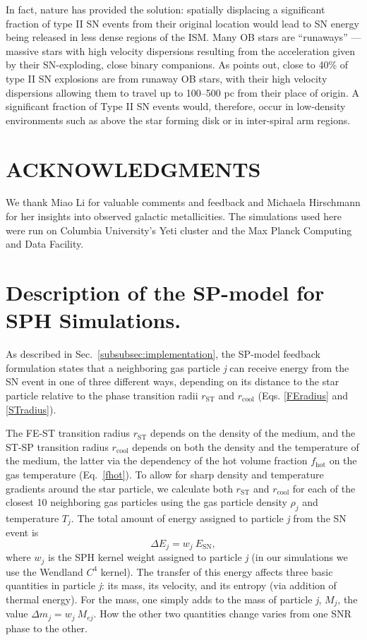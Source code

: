 \documentclass[iop]{emulateapj}
\begin{document}
In fact, nature has provided the solution: spatially displacing a significant fraction of type II SN events from their original location would lead to SN energy being released in less dense regions of the ISM. Many OB stars are ``runaways'' ---massive stars with high velocity dispersions resulting from the acceleration given by their SN-exploding, close binary companions. As \citet{Li15} points out, close to 40\% of type II SN explosions are from runaway OB stars, with their high velocity dispersions allowing them to travel up to 100--500 pc from their place of origin. A significant fraction of Type II SN events would, therefore, occur in low-density environments such as above the star forming disk or in inter-spiral arm regions.   

\section*{ACKNOWLEDGMENTS}
We thank Miao Li for valuable comments and feedback and Michaela Hirschmann for her insights into observed galactic metallicities. The simulations used here were run on Columbia University's Yeti cluster and the Max Planck Computing and Data Facility.



\appendix

\section{Description of the SP-model for SPH Simulations.}\label{appendix}
As described in Sec.~\ref{subsubsec:implementation}, the SP-model feedback formulation states that a neighboring gas particle \textit{j} can receive energy from the SN event in one of three different ways, depending on its distance to the star particle relative to the phase transition radii $r_{\mathrm{ST}}$ and $r_{\mathrm{cool}}$ (Eqs. \ref{FEradius} and \ref{STradius}).

The FE-ST transition radius $r_{\mathrm{ST}}$ depends on the density of the medium, and the ST-SP transition radius $r_{\mathrm{cool}}$ depends on both the density and the temperature of the medium, the latter via the dependency of the hot volume fraction $f_{\mathrm{hot}}$ on the gas temperature (Eq.~\ref{fhot}). To allow for sharp density and temperature gradients around the star particle, we calculate both $r_{\mathrm{ST}}$ and $r_{\mathrm{cool}}$ for each of the closest 10 neighboring gas particles using the gas particle density $\rho_j$ and temperature $T_j$. The total amount of energy assigned to particle \textit{j} from the SN event is
\begin{equation}\label{delE}
\Delta E_j = w_j\ E_{\mathrm{SN}},
\end{equation}
where $w_j$ is the SPH kernel weight assigned to particle \textit{j} (in our simulations we use the Wendland $C^4$ kernel). The transfer of this energy affects three basic quantities in particle \textit{j}: its mass, its velocity, and its entropy (via addition of thermal energy). For the mass, one simply adds to the mass of particle \textit{j}, $M_j$, the value $\Delta m_j = w_j\ M_{ej}$. How the other two quantities change varies from one SNR phase to the other.
\end{document}
